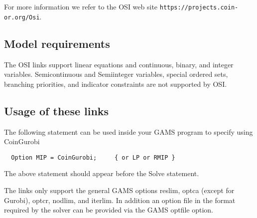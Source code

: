 For more information we refer to the OSI web site \texttt{https://projects.coin-or.org/Osi}.

\subsection{Model requirements}

The OSI links support linear equations and continuous, binary, and integer variables.
Semicontinuous and Semiinteger variables, special ordered sets, branching priorities, and indicator constraints are not supported by OSI.

\subsection{Usage of these links}

The following statement can be used inside your GAMS program to specify using CoinGurobi
\begin{verbatim}
  Option MIP = CoinGurobi;     { or LP or RMIP }
\end{verbatim}

The above statement should appear before the Solve statement.

The links only support the general GAMS options reslim, optca (except for Gurobi), optcr, nodlim, and iterlim.
In addition an option file in the format required by the solver can be provided via the GAMS optfile option.

\chapterend
